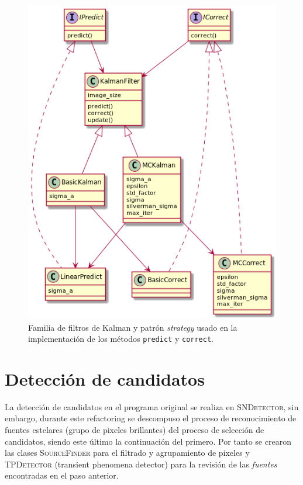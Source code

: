 \begin{figure}
\centering
\includegraphics[scale=.5]{images/kalmanfilter_class}
\caption{Familia de filtros de Kalman y patr\'on \textit{strategy} usado en la implementaci\'on de los m\'etodos \texttt{predict} y \texttt{correct}.}
\label{fig:ref1}
\end{figure}

\section{Detecci\'on de candidatos}
La detecci\'on de candidatos en el programa original se realiza en \textsc{SNDetector}, sin embargo, durante este refactoring se descompuso el proceso de reconocimiento de fuentes estelares (grupo de pixeles brillantes) del proceso de selecci\'on de candidatos, siendo este \'ultimo la continuaci\'on del primero. Por tanto se crearon las clases \textsc{SourceFinder} para el filtrado y agrupamiento de pixeles y \textsc{TPDetector} (transient phenomena detector) para la revisi\'on de las \textit{fuentes} encontradas en el paso anterior.
